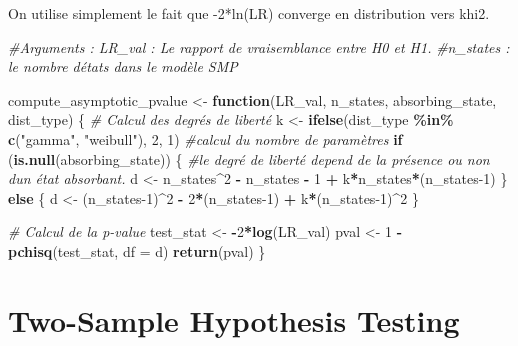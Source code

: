 \documentclass[
]{article}
\newenvironment{Shaded}{\begin{snugshade}}{\end{snugshade}}
\newcommand{\AttributeTok}[1]{\textcolor[rgb]{0.13,0.29,0.53}{#1}}
\newcommand{\CommentTok}[1]{\textcolor[rgb]{0.56,0.35,0.01}{\textit{#1}}}
\newcommand{\ControlFlowTok}[1]{\textcolor[rgb]{0.13,0.29,0.53}{\textbf{#1}}}
\newcommand{\DecValTok}[1]{\textcolor[rgb]{0.00,0.00,0.81}{#1}}
\newcommand{\FunctionTok}[1]{\textcolor[rgb]{0.13,0.29,0.53}{\textbf{#1}}}
\newcommand{\NormalTok}[1]{#1}
\newcommand{\OtherTok}[1]{\textcolor[rgb]{0.56,0.35,0.01}{#1}}
\newcommand{\SpecialCharTok}[1]{\textcolor[rgb]{0.81,0.36,0.00}{\textbf{#1}}}
\newcommand{\StringTok}[1]{\textcolor[rgb]{0.31,0.60,0.02}{#1}}
\begin{document}
On utilise simplement le fait que -2*ln(LR) converge en distribution
vers khi2.

\begin{Shaded}
\begin{Highlighting}[]
\CommentTok{\#Arguments : LR\_val : Le rapport de vraisemblance entre H0 et H1.}
\CommentTok{\#n\_states : le nombre d\textquotesingle{}états dans le modèle SMP}



\NormalTok{compute\_asymptotic\_pvalue }\OtherTok{\textless{}{-}} \ControlFlowTok{function}\NormalTok{(LR\_val, n\_states, absorbing\_state, dist\_type) \{}
  \CommentTok{\# Calcul des degrés de liberté}
\NormalTok{  k }\OtherTok{\textless{}{-}} \FunctionTok{ifelse}\NormalTok{(dist\_type }\SpecialCharTok{\%in\%} \FunctionTok{c}\NormalTok{(}\StringTok{"gamma"}\NormalTok{, }\StringTok{"weibull"}\NormalTok{), }\DecValTok{2}\NormalTok{, }\DecValTok{1}\NormalTok{) }\CommentTok{\#calcul du nombre de paramètres }
  \ControlFlowTok{if}\NormalTok{ (}\FunctionTok{is.null}\NormalTok{(absorbing\_state)) \{ }\CommentTok{\#le degré de liberté depend de la présence ou non d\textquotesingle{}un état absorbant.}
\NormalTok{    d }\OtherTok{\textless{}{-}}\NormalTok{ n\_states}\SpecialCharTok{\^{}}\DecValTok{2} \SpecialCharTok{{-}}\NormalTok{ n\_states }\SpecialCharTok{{-}} \DecValTok{1} \SpecialCharTok{+}\NormalTok{ k}\SpecialCharTok{*}\NormalTok{n\_states}\SpecialCharTok{*}\NormalTok{(n\_states}\DecValTok{{-}1}\NormalTok{)}
\NormalTok{  \} }\ControlFlowTok{else}\NormalTok{ \{}
\NormalTok{    d }\OtherTok{\textless{}{-}}\NormalTok{ (n\_states}\DecValTok{{-}1}\NormalTok{)}\SpecialCharTok{\^{}}\DecValTok{2} \SpecialCharTok{{-}} \DecValTok{2}\SpecialCharTok{*}\NormalTok{(n\_states}\DecValTok{{-}1}\NormalTok{) }\SpecialCharTok{+}\NormalTok{ k}\SpecialCharTok{*}\NormalTok{(n\_states}\DecValTok{{-}1}\NormalTok{)}\SpecialCharTok{\^{}}\DecValTok{2}
\NormalTok{  \}}
  
  \CommentTok{\# Calcul de la p{-}value}
\NormalTok{  test\_stat }\OtherTok{\textless{}{-}} \SpecialCharTok{{-}}\DecValTok{2}\SpecialCharTok{*}\FunctionTok{log}\NormalTok{(LR\_val)}
\NormalTok{  pval }\OtherTok{\textless{}{-}} \DecValTok{1} \SpecialCharTok{{-}} \FunctionTok{pchisq}\NormalTok{(test\_stat, }\AttributeTok{df =}\NormalTok{ d)}
  \FunctionTok{return}\NormalTok{(pval)}
\NormalTok{\}}
\end{Highlighting}
\end{Shaded}

\newpage

\section{Two-Sample Hypothesis Testing}
\end{document}

